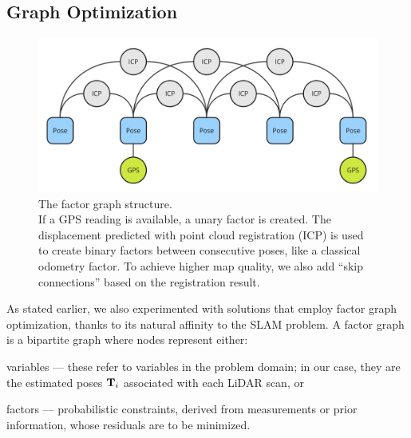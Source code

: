 \subsection{Graph Optimization}
\label{subsec:graph-optimization}

\begin{figure}
	\centering
	\includegraphics[width=0.6\linewidth]{images/graph.jpg}
	\caption[Factor Graph Structure]{The factor graph structure.\\If a GPS reading is available, a unary factor is created. The displacement predicted with point cloud registration (ICP) is used to create binary factors between consecutive poses, like a classical odometry factor. To achieve higher map quality, we also add ``skip connections'' based on the registration result.}
	\label{fig:factor-graph}
\end{figure}

As stated earlier, we also experimented with solutions that employ factor graph optimization, thanks to its natural affinity to the SLAM problem. A factor graph \cite{dellaert2012factor} is a bipartite graph where nodes represent either:
\begin{compactitem}
	\item variables --- these refer to variables in the problem domain; in our case, they are the estimated poses $\mathbf{T}_i$ associated with each LiDAR scan, or
	\item factors --- probabilistic constraints, derived from measurements or prior information, whose residuals are to be minimized.
\end{compactitem}

